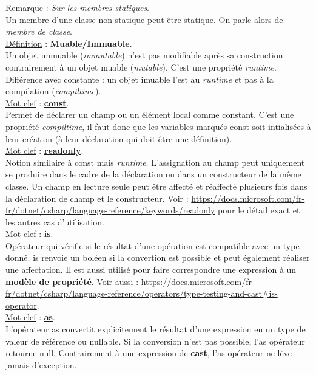 \documentclass[a4paper,12pt,twoside]{article}
\newcommand{\urlcolor}{magenta}  %
\newcommand{\keycolor}{purple} %
\newcommand{\incode}[1]{{\footnotesize\ttfamily #1}} %
\newcommand{\rem}[2]{\noindent\underline{Remarque} : \textit{#1}.\\ \indent #2}
\newcommand{\defi}[2]{\noindent\underline{Définition} : \textbf{#1}.\\ \indent #2}
\newcommand{\keyref}[2]{\hypersetup{urlcolor=\keycolor} \href{#1}{\textbf{#2}}\hypersetup{urlcolor=\urlcolor}}
\newcommand{\keyword}[3]{\noindent\underline{Mot clef} : \keyref{#1}{#2}. \\ \indent #3}
\begin{document}
\rem{Sur les membres statiques}{Un membre d'une classe non-statique peut être statique. On parle alors de \textit{membre de classe}}.\\

\defi{Muable/Immuable}{Un objet immuable (\textit{immutable}) n'est pas modifiable après sa construction contrairement à un objet muable (\textit{mutable}). C'est une propriété \textit{runtime}. Différence avec constante : un objet imuable l'est au \textit{runtime} et pas à la compilation (\textit{compiltime}).}\\

\keyword{https://docs.microsoft.com/fr-fr/dotnet/csharp/language-reference/keywords/const}{const}{Permet de déclarer un champ ou un élément local comme constant. C'est une propriété \textit{compiltime}, il faut donc que les variables marqués \incode{const} soit intialisées à leur création (à leur déclaration qui doit être une définition).}\\

\keyword{https://docs.microsoft.com/fr-fr/dotnet/csharp/language-reference/keywords/readonly}{readonly}{Notion similaire à \incode{const} mais \textit{runtime}. L’assignation au champ peut uniquement se produire dans le cadre de la déclaration ou dans un constructeur de la même classe. Un champ en lecture seule peut être affecté et réaffecté plusieurs fois dans la déclaration de champ et le constructeur. Voir : \url{https://docs.microsoft.com/fr-fr/dotnet/csharp/language-reference/keywords/readonly} pour le détail exact et les autres cas d'utilisation.}\\

\keyword{https://docs.microsoft.com/fr-fr/dotnet/csharp/language-reference/operators/is}{is}{Opérateur qui vérifie si le résultat d'une opération est compatible avec un type donné. \incode{is} renvoie un boléen si la convertion est possible et peut également réaliser une affectation. Il est aussi utilisé pour faire correspondre une expression à un \keyref{https://docs.microsoft.com/fr-fr/dotnet/csharp/language-reference/operators/patterns\#property-pattern}{modèle de propriété}. Voir aussi : \url{https://docs.microsoft.com/fr-fr/dotnet/csharp/language-reference/operators/type-testing-and-cast\#is-operator}.}\\

\keyword{https://docs.microsoft.com/fr-fr/dotnet/csharp/language-reference/operators/type-testing-and-cast\#as-operator}{as}{L’opérateur \incode{as} convertit explicitement le résultat d’une expression en un type de valeur de référence ou nullable. Si la conversion n’est pas possible, l'\incode{as} opérateur retourne \incode{null}. Contrairement à une expression de \keyref{https://docs.microsoft.com/fr-fr/dotnet/csharp/language-reference/operators/type-testing-and-cast\#cast-expression}{cast}, l'\incode{as} opérateur ne lève jamais d’exception.}\\
\end{document}
